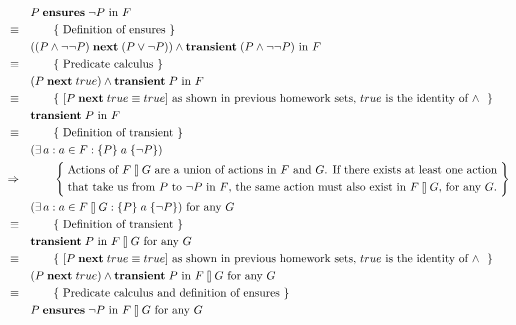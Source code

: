\documentclass[10pt,letter]{article}
\def\fatbar{\talloblong}
\begin{document}
\begin{align*}
& P\; \textrm{\textbf{ensures}}\; \neg P \textrm{ in } F
\\ \equiv \quad & \qquad \{\ \textrm{Definition of ensures}\ \} \\
& ( ( P \land \neg\neg P )\; \textrm{\textbf{next}}\; (P \lor \neg P)) \land \textrm{\textbf{transient}}\; (P \land \neg\neg P) \textrm{ in } F
\\ \equiv \quad & \qquad \{\ \textrm{Predicate calculus}\ \} \\
& ( P\; \textrm{\textbf{next}}\; true) \land \textrm{\textbf{transient}}\; P \textrm{ in } F
\\ \equiv \quad & \qquad \{\ [ P\; \textrm{\textbf{next}}\; true \equiv true ] \textrm{  as shown in previous homework sets, $true$ is the identity of $\land$ }\ \} \\
& \textrm{\textbf{transient}}\; P \textrm{ in } F
\\ \equiv \quad & \qquad \{\ \textrm{Definition of transient}\ \} \\
& ( \exists\, a : a \in F : \{P\}\; a\; \{\neg P\} )
\\ \Rightarrow \quad & \qquad \left\{ \;
\begin{aligned}
&\textrm{Actions of $F \fatbar G$ are a union of actions in $F$ and $G$. If there exists at least one action}\\
& \textrm{that take us from $P$ to $\neg P$ in $F$, the same action must also exist in $F \fatbar G$, for any $G$.}
\end{aligned}
\; \right\} \\
& ( \exists\, a : a \in F \fatbar G : \{P\}\; a\; \{\neg P\} ) \textrm{ for any } G
\\ \equiv \quad & \qquad \{\ \textrm{Definition of transient}\ \} \\
& \textrm{\textbf{transient}}\; P \textrm{ in } F \fatbar G \textrm{ for any } G
\\ \equiv \quad & \qquad \{\ [ P\; \textrm{\textbf{next}}\; true \equiv true ] \textrm{  as shown in previous homework sets, $true$ is the identity of $\land$ }\ \} \\
& ( P\; \textrm{\textbf{next}}\; true) \land \textrm{\textbf{transient}}\; P \textrm{ in } F \fatbar G \textrm{ for any } G
\\ \equiv \quad & \qquad \{\ \textrm{Predicate calculus and definition of ensures}\ \} \\
& P\; \textrm{\textbf{ensures}}\; \neg P \textrm{ in } F \fatbar G \textrm{ for any } G
\end{align*}
\end{document}
